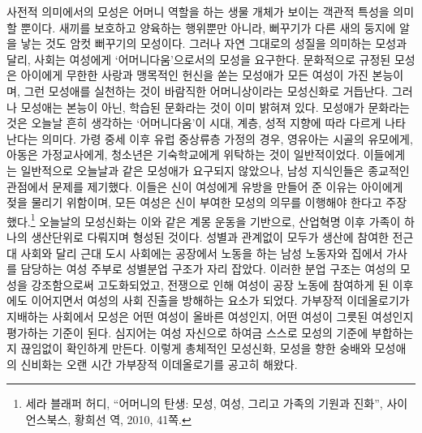 사전적 의미에서의 모성은 어머니 역할을 하는 생물 개체가 보이는 객관적 특성을 의미할 뿐이다. 새끼를 보호하고 양육하는 행위뿐만 아니라, 뻐꾸기가 다른 새의 둥지에 알을 낳는 것도 암컷 뻐꾸기의 모성이다. 그러나 자연 그대로의 성질을 의미하는 모성과 달리, 사회는 여성에게 `어머니다움'으로서의 모성을 요구한다. 문화적으로 규정된 모성은 아이에게 무한한 사랑과 맹목적인 헌신을 쏟는 모성애가 모든 여성이 가진 본능이며, 그런 모성애를 실천하는 것이 바람직한 어머니상이라는 모성신화로 거듭난다. 그러나 모성애는 본능이 아닌, 학습된 문화라는 것이 이미 밝혀져 있다. 모성애가 문화라는 것은 오늘날 흔히 생각하는 `어머니다움'이 시대, 계층, 성적 지향에 따라 다르게 나타난다는 의미다. 가령 중세 이후 유럽 중상류층 가정의 경우, 영유아는 시골의 유모에게, 아동은 가정교사에게, 청소년은 기숙학교에게 위탁하는 것이 일반적이었다. 이들에게는 일반적으로 오늘날과 같은 모성애가 요구되지 않았으나, 남성 지식인들은 종교적인 관점에서 문제를 제기했다. 이들은 신이 여성에게 유방을 만들어 준 이유는 아이에게 젖을 물리기 위함이며, 모든 여성은 신이 부여한 모성의 의무를 이행해야 한다고 주장했다.\footnote{세라 블래퍼 허디, ``어머니의 탄생: 모성, 여성, 그리고 가족의 기원과 진화'', 사이언스북스, 황희선 역, 2010, 41쪽.} 오늘날의 모성신화는 이와 같은 계몽 운동을 기반으로, 산업혁명 이후 가족이 하나의 생산단위로 다뤄지며 형성된 것이다. 성별과 관계없이 모두가 생산에 참여한 전근대 사회와 달리 근대 도시 사회에는 공장에서 노동을 하는 남성 노동자와 집에서 가사를 담당하는 여성 주부로 성별분업 구조가 자리 잡았다. 이러한 분업 구조는 여성의 모성을 강조함으로써 고도화되었고, 전쟁으로 인해 여성이 공장 노동에 참여하게 된 이후에도 이어지면서 여성의 사회 진출을 방해하는 요소가 되었다. 가부장적 이데올로기가 지배하는 사회에서 모성은 어떤 여성이 올바른 여성인지, 어떤 여성이 그릇된 여성인지 평가하는 기준이 된다. 심지어는 여성 자신으로 하여금 스스로 모성의 기준에 부합하는지 끊임없이 확인하게 만든다. 이렇게 총체적인 모성신화, 모성을 향한 숭배와 모성애의 신비화는 오랜 시간 가부장적 이데올로기를 공고히 해왔다.

